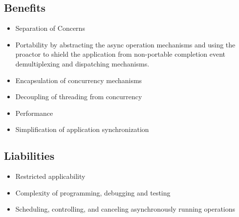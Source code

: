 \subsection{Benefits}

\begin{itemize}
	\item Separation of Concerns
	\item Portability by abstracting the async operation mechanisms and using the proactor to shield the application from non-portable completion event demultiplexing and dispatching mechanisms.
	\item Encapsulation of concurrency mechanisms
	\item Decoupling of threading from concurrency
	\item Performance
	\item Simplification of application synchronization
\end{itemize}


\subsection{Liabilities}

\begin{itemize}
	\item Restricted applicability
	\item Complexity of programming, debugging and testing
	\item Scheduling, controlling, and canceling asynchronously running operations
\end{itemize}

